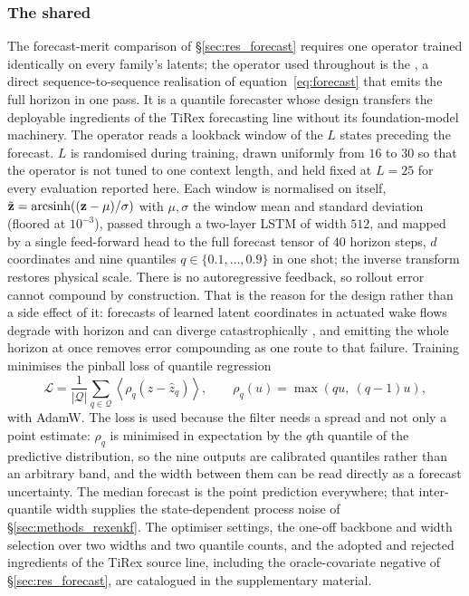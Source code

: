 
\subsubsection{The shared \DirectFC}
\label{sec:methods_rex}

The forecast-merit comparison of \S\ref{sec:res_forecast} requires one
operator trained identically on every family's latents; the operator used
throughout is the \DirectFC, a direct sequence-to-sequence realisation of
equation~\eqref{eq:forecast} that emits the full horizon in one pass. It is a
quantile forecaster whose design
transfers the deployable ingredients of the TiRex forecasting line \citep{tirex,tirex2} without its foundation-model machinery. The operator reads a lookback
window of the $L$ states preceding the forecast. $L$ is randomised during
training, drawn uniformly from $16$ to $30$ so that the operator is not tuned to
one context length, and held fixed at $L = 25$ for every evaluation reported
here. Each window is normalised on itself,
$\tilde{\mathbf{z}} = \operatorname{arcsinh}\!\left((\mathbf{z} - \mu)/\sigma\right)$
with $\mu, \sigma$ the window mean and standard deviation (floored at
$10^{-3}$), passed through a two-layer LSTM of width $512$, and mapped by
a single feed-forward head to the full forecast tensor of $40$ horizon
steps, $d$ coordinates and nine quantiles $q \in \{0.1, \dots, 0.9\}$ in
one shot; the inverse transform restores physical scale. There is no
autoregressive feedback, so rollout error cannot compound by construction. That
is the reason for the design rather than a side effect of it: forecasts of
learned latent coordinates in actuated wake flows degrade with horizon and can
diverge catastrophically \citep{solerarico_compactness_underreview}, and
emitting the whole horizon at once removes error compounding as one route to
that failure.
Training minimises the pinball loss of quantile regression \citep{koenker1978}
\begin{equation}
  \mathcal{L} = \frac{1}{|\mathcal{Q}|} \sum_{q \in \mathcal{Q}}
  \left\langle \rho_q\!\left(z - \hat{z}_q\right) \right\rangle,
  \qquad
  \rho_q(u) = \max\!\left(q u,\ (q - 1) u\right),
  \label{eq:pinball}
\end{equation}
with AdamW. The loss is used because the filter needs a spread and not only a
point estimate: $\rho_q$ is minimised in expectation by the $q$th quantile of the
predictive distribution, so the nine outputs are calibrated quantiles rather than
an arbitrary band, and the width between them can be read directly as a forecast
uncertainty. The median forecast is the point prediction everywhere; that
inter-quantile width supplies the state-dependent process noise of
\S\ref{sec:methods_rexenkf}. The optimiser settings, the one-off backbone and
width selection over two widths and two quantile counts, and the adopted and rejected
ingredients of the TiRex source line, including the oracle-covariate negative of
\S\ref{sec:res_forecast}, are catalogued in the supplementary material.\re
